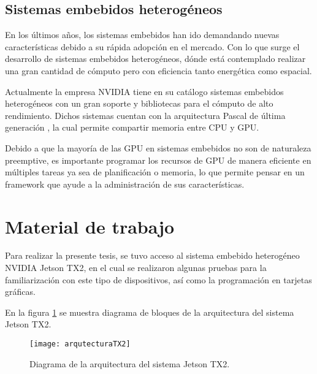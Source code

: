     \subsection{Sistemas embebidos heterogéneos} \label{sec:seh}
    \vspace{0.3cm}
    En los últimos años, los sistemas embebidos han ido demandando nuevas características debido a su rápida adopción en el mercado. Con lo que surge el desarrollo de sistemas embebidos heterogéneos, dónde está contemplado realizar una gran cantidad de cómputo pero con eficiencia tanto energética como espacial.
    \vspace{0.3cm}

    Actualmente la empresa NVIDIA tiene en su catálogo sistemas embebidos heterogéneos con un gran soporte y bibliotecas para el cómputo de alto rendimiento. Dichos sistemas cuentan con la arquitectura Pascal de última generación \cite{GPUArt}, la cual permite compartir memoria entre CPU y GPU.
               
   \vspace{0.3cm}
   
    Debido a que la mayoría de las GPU en sistemas embebidos no son de naturaleza preemptive, es importante programar los recursos de GPU de manera eficiente en múltiples tareas \cite{TX2I} ya sea de planificación o memoria, lo que permite pensar en un framework que ayude a la administración de sus características. 
    
 \section{Material de trabajo}
 
Para realizar la presente tesis, se tuvo acceso al sistema embebido heterogéneo NVIDIA Jetson TX2, en el cual se realizaron algunas pruebas para la familiarización con este tipo de dispositivos, así como la programación en tarjetas gráficas.
            
   \vspace{0.3cm}
   
En la figura \ref{fig:arqutecturaTX2} se muestra diagrama de bloques de la arquitectura del sistema Jetson TX2.

      \begin{figure}[ht]
      \centering
        \texttt{[image: arqutecturaTX2]}
        \caption{Diagrama de la arquitectura del sistema Jetson TX2\cite{ArqTX2}.}
        \label{fig:arqutecturaTX2}
    \end{figure}

